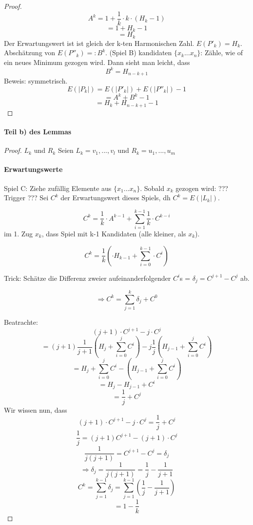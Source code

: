 \begin{proof}
$$A^k = 1 + \frac{1}{k} \cdot k \cdot (H_k - 1)$$
$$    = 1 + H_k - 1$$
$$    = H_k$$
Der Erwartungswert ist ist gleich der k-ten Harmonischen Zahl. $E(P'_k) = H_k$. Abschätzung von $E(P''_k) =: B^k$. (Spiel B) kandidaten $ \{ x_k ... x_n\} $: Zähle, wie of ein neues Minimum gezogen wird. Dann sieht man leicht, dass 
$$B^k = H_{n-k+1}$$
Beweis: symmetrisch.
$$E(|P_k|) = E(|P'_k|) + E(|P''_k|) - 1 $$
$$ = A^k + B^k - 1 $$
$$ = H_k + H_{n-k+1} - 1 $$

\end{proof}

\paragraph{Teil b) des Lemmas}

\begin{proof}{$L_k$ und $R_k$}
Seien $ L_k = v_1, ... , v_l $ und $ R_k = u_1, ... , u_m $
\paragraph{Erwartungswerte}
Spiel C: Ziehe zufällig Elemente aus $ \{x_1 ... x_n \} $.
Sobald $ x_k $ gezogen wird: ??? Trigger ???
Sei $ C^k $ der Erwartungswert dieses Spiels, dh $ C^k = E(|L_k|) $.

$$ C^k = \frac{1}{k} \cdot A^{k-1} + \sum_{i=1}^{k-1} \frac{1}{k} \cdot C^{k-i}$$
im 1. Zug $ x_k $, dass Spiel mit k-1 Kandidaten (alle kleiner, als $ x_k $).

$$ C^k = \frac{1}{k} (\cdot H_{k-1} + \sum_{i=0}^{k-1} \cdot C^{i})$$

Trick: Schätze die Differenz zweier aufeinanderfolgender $ C^i $s = $ \delta_j = C^{j+1} - C ^j $ ab.

$$\Rightarrow C^k = \sum_{j=1}^k \delta_j + C^0$$

Beatrachte: 
$$ (j + 1) \cdot C^{j+1} - j \cdot C ^j $$
$$ = (j + 1) \frac{1}{j+1} (H_j + \sum_{i=0}^j C^i) - j \frac{1}{j} (H_{j-1} + \sum_{i=0}^j C^i)$$
$$ = H_j + \sum_{i=0}^j C^i - (H_{j-1} + \sum_{i=0}^j C^i)$$
$$ = H_j - H_{j-1} + C^i$$ 
$$ = \frac{1}{j} + C^j$$
Wir wissen nun, dass
$$ (j + 1) \cdot C^{j+1} - j \cdot C ^j  = \frac{1}{j} + C^j$$
$$ \frac{1}{j} = (j+1) C^{j+1} - (j+1) \cdot C^j $$
$$ \frac{1}{j(j+1)} = C^{j+1} - C^j = \delta_j $$
$$ \Rightarrow \delta_j = \frac{1}{j(j+1)} = \frac{1}{j} - \frac{1}{j+1}$$
$$ C^k = \sum_{j=1}^{k-1} \delta_j = \sum_{j=1}^{k-1} (\frac{1}{j} - \frac{1}{j+1})$$
$$ = 1 - \frac{1}{k}$$

\end{proof}



